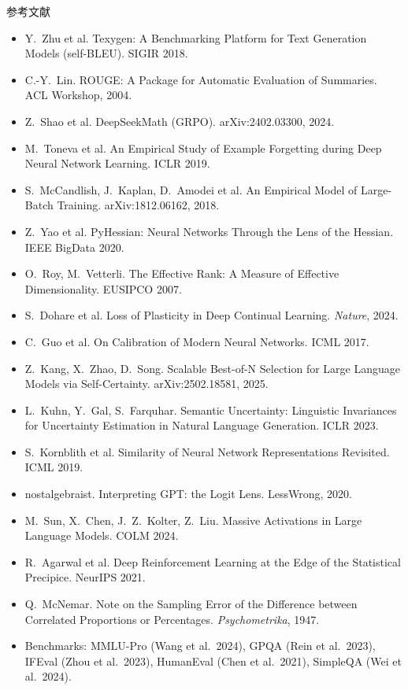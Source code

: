 \documentclass[aspectratio=169,11pt]{beamer}
\begin{document}
\begin{frame}[allowframebreaks]{参考文献}
\begin{itemize}
  \item Y.~Zhu et al. Texygen: A Benchmarking Platform for Text Generation Models (self-BLEU). SIGIR 2018.
  \item C.-Y.~Lin. ROUGE: A Package for Automatic Evaluation of Summaries. ACL Workshop, 2004.
  \item Z.~Shao et al. DeepSeekMath (GRPO). arXiv:2402.03300, 2024.
  \item M.~Toneva et al. An Empirical Study of Example Forgetting during Deep Neural Network Learning. ICLR 2019.
  \item S.~McCandlish, J.~Kaplan, D.~Amodei et al. An Empirical Model of Large-Batch Training. arXiv:1812.06162, 2018.
  \item Z.~Yao et al. PyHessian: Neural Networks Through the Lens of the Hessian. IEEE BigData 2020.
  \item O.~Roy, M.~Vetterli. The Effective Rank: A Measure of Effective Dimensionality. EUSIPCO 2007.
  \item S.~Dohare et al. Loss of Plasticity in Deep Continual Learning. \emph{Nature}, 2024.
  \item C.~Guo et al. On Calibration of Modern Neural Networks. ICML 2017.
  \item Z.~Kang, X.~Zhao, D.~Song. Scalable Best-of-N Selection for Large Language Models via Self-Certainty. arXiv:2502.18581, 2025.
  \item L.~Kuhn, Y.~Gal, S.~Farquhar. Semantic Uncertainty: Linguistic Invariances for Uncertainty Estimation in Natural Language Generation. ICLR 2023.
  \item S.~Kornblith et al. Similarity of Neural Network Representations Revisited. ICML 2019.
  \item nostalgebraist. Interpreting GPT: the Logit Lens. LessWrong, 2020.
  \item M.~Sun, X.~Chen, J.~Z.~Kolter, Z.~Liu. Massive Activations in Large Language Models. COLM 2024.
  \item R.~Agarwal et al. Deep Reinforcement Learning at the Edge of the Statistical Precipice. NeurIPS 2021.
  \item Q.~McNemar. Note on the Sampling Error of the Difference between Correlated Proportions or Percentages. \emph{Psychometrika}, 1947.
  \item Benchmarks: MMLU-Pro (Wang et al.\ 2024), GPQA (Rein et al.\ 2023), IFEval (Zhou et al.\ 2023), HumanEval (Chen et al.\ 2021), SimpleQA (Wei et al.\ 2024).
\end{itemize}
\end{frame}
\end{document}
